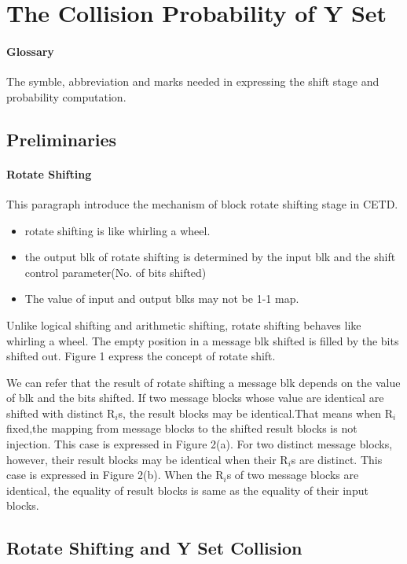 \documentclass{article}
\begin{document}
\section{The Collision Probability of Y Set}
\paragraph{Glossary}
The symble, abbreviation and marks needed in expressing the shift stage and probability computation.
\subsection{Preliminaries}
\paragraph{Rotate Shifting}
This paragraph introduce the mechanism of block rotate shifting stage in CETD. 
\begin{itemize}
	\item rotate shifting is like whirling a wheel.
	\item the output blk of rotate shifting is determined by the input blk and the shift control parameter(No. of bits shifted)
	\item The value of input and output blks may not be 1-1 map.
\end{itemize}
Unlike logical shifting and arithmetic shifting, rotate shifting behaves like whirling a wheel. The empty position in a message blk shifted is filled by the bits shifted out. Figure 1 express the concept of rotate shift. 

We can refer that the result of rotate shifting a message blk depends on the value of blk and the bits shifted.  
If two message blocks whose value are identical are shifted with distinct R$_i$s, the result blocks may be identical.That means when R$_i$ fixed,the mapping from message blocks to the shifted result blocks is not injection. This case is expressed in Figure 2(a).
For two distinct message blocks, however, their result blocks may be identical when their R$_i$s are distinct. This case is expressed in Figure 2(b).
When the R$_i$s of two message blocks are identical, the equality of result blocks is same as the equality of their input blocks.

\subsection{Rotate Shifting and Y Set Collision}
\end{document}
